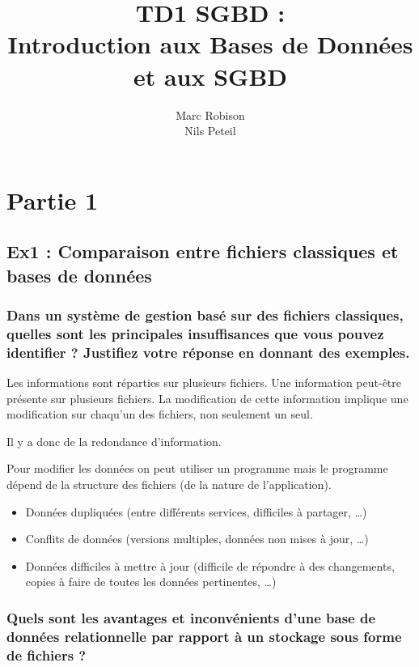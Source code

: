 \documentclass{article}
\title{TD1 SGBD : \\ Introduction aux Bases de Données et aux SGBD}
\author{Marc Robison\\
	Nils Peteil}
\begin{document}
\maketitle

\tableofcontents 

\section{Partie 1}
\subsection{Ex1 : Comparaison entre fichiers classiques et bases de données}
\subsubsection{Dans un système de gestion basé sur des fichiers classiques, quelles sont les principales insuffisances que vous pouvez identifier ? Justifiez votre réponse en donnant des exemples.} \par \vspace{3mm}

Les informations sont réparties sur plusieurs fichiers. Une information peut-être présente sur plusieurs fichiers. La modification de cette information implique une modification sur chaqu'un des fichiers, non seulement un seul.

Il y a donc de la redondance d'information.

Pour modifier les données on peut utiliser un programme mais le programme dépend de la structure des fichiers (de la nature de l'application).

\begin{itemize}
  \item Données dupliquées (entre différents services, difficiles à partager, …)
  \item Conflits de données (versions multiples, données non mises à jour, …)
  \item Données difficiles à mettre à jour (difficile de répondre à des changements, copies à
faire de toutes les données pertinentes, …)
\end {itemize}


\subsubsection{Quels sont les avantages et inconvénients d’une base de données relationnelle par rapport à un stockage sous forme de fichiers ?}
\vspace{3mm}
\end{document}
